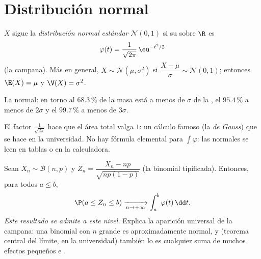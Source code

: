 \section{Distribución normal}

\begin{definition}\label{def:g12:contdist:normal}
$X$ sigue la \emph{distribución normal}
\emph{estándar} $\mathcal N(0, 1)$ si su  sobre $\R$ es
\[
\varphi(t) = \frac{1}{\sqrt{2\pi}}\,\eu^{-t^2/2}
\]
(la campana). Más en general, $X \sim \mathcal N(\mu, \sigma^2)$ si
$\dfrac{X - \mu}{\sigma} \sim \mathcal N(0,1)$; entonces $\E(X) = \mu$ y
$\V(X) = \sigma^2$.
\end{definition}

\begin{omfigure}

{\small La  normal: en torno al $68.3\,\%$ de la masa está a menos
de $\sigma$ de la , el $95.4\,\%$ a menos de $2\sigma$ y el
$99.7\,\%$ a menos de $3\sigma$.}
\end{omfigure}

\begin{remark}
El factor $\frac{1}{\sqrt{2\pi}}$ hace que el área total valga $1$: un
cálculo famoso (la \emph{ de Gauss}) que se hace en la universidad.
No hay fórmula elemental para $\int \varphi$: las  normales
se leen en tablas o en la calculadora.
\end{remark}

\begin{theorem}\label{thm:g12:contdist:tcl}
Sean $X_n \sim \mathcal B(n, p)$ y
$Z_n = \dfrac{X_n - np}{\sqrt{np(1-p)}}$ (la binomial tipificada).
Entonces, para todos $a \leq b$,
\[
\P(a \leq Z_n \leq b) \xrightarrow[n\to+\infty]{}
\int_a^b \varphi(t)\,\dd t .
\]
\emph{Este resultado se admite a este nivel.} Explica la aparición
universal de la campana: una binomial con $n$ grande es aproximadamente
normal, y (teorema central del límite, en la universidad) también lo es
cualquier suma de muchos efectos pequeños e .
\end{theorem}

